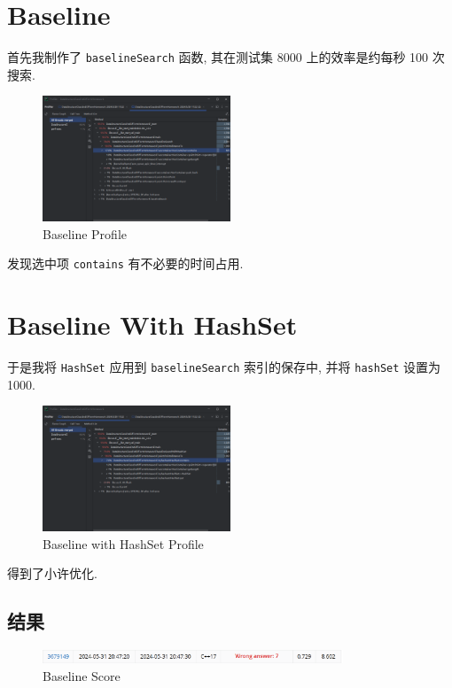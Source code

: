 \section{Baseline}

首先我制作了 \texttt{baselineSearch} 函数, 其在测试集 8000 上的效率是约每秒 100 次搜索.

\begin{figure}[H]
    \centering
    \includegraphics[width=0.5\textwidth]{img/baseline-profile}
    \caption{Baseline Profile}
\end{figure}

发现选中项 \texttt{contains} 有不必要的时间占用.


\section{Baseline With HashSet}

于是我将 \texttt{HashSet} 应用到 \texttt{baselineSearch} 索引的保存中, 并将 \texttt{hashSet} 设置为 1000.

\begin{figure}[H]
    \centering
    \includegraphics[width=0.5\textwidth]{img/baseline-with-hashset-profile}
    \caption{Baseline with HashSet Profile}
\end{figure}

得到了小许优化.

\subsection{结果}

\begin{figure}[H]
    \centering
    \includegraphics[width=0.8\textwidth]{img/baseline-score}
    \caption{Baseline Score}
\end{figure}

